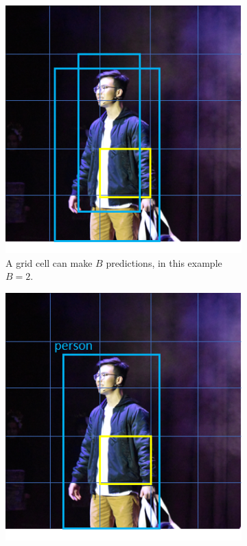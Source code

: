 \begin{figure}[ht]
	\begin{subfigure}[b]{.45\textwidth}
		\centering
		\includegraphics[width=1.0\linewidth]{img/chapter5_implementation/yoloAlgo1.png}
		\caption{A grid cell can make $B$ predictions, in this example $B=2$.}
	\end{subfigure}%
	\hspace{\fill} 
	\begin{subfigure}[b]{.45\textwidth}
		\centering
		\includegraphics[width=1.0\linewidth]{img/chapter5_implementation/yoloAlgo.png}

\end{subfigure}
\end{figure}
